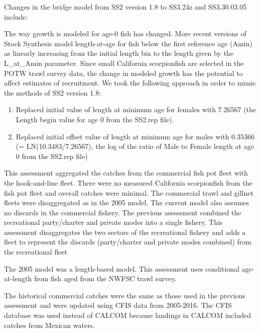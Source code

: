 \documentclass[12pt,]{article}
\begin{document}
Changes in the bridge model from SS2 version 1.8 to SS3.24z and
SS3.30.03.05 include:

The way growth is modeled for age-0 fish has changed. More recent
versions of Stock Synthesis model length-at-age for fish below the first
reference age (Amin) as linearly increasing from the initial length bin
to the length given by the L\_at\_Amin parameter. Since small California
scorpionfish are selected in the POTW trawl survey data, the change in
modeled growth has the potential to affect estimates of recruitment. We
took the following approach in order to mimic the methods of SS2 version
1.8:

\begin{enumerate}
 
 \item Replaced initial value of length at minimum age for females with 7.26567 (the Length begin value for age 
 0 from the SS2.rep file).
 
  \item Replaced initial offset value of length at minimum age for males with 0.35366 (= LN(10.3483/7.26567), the 
  log of the ratio of Male to Female length at age 0 from the SS2.rep file)

\end{enumerate}

This assessment aggregated the catches from the commercial fish pot
fleet with the hook-and-line fleet. There were no measured California
scorpionfish from the fish pot fleet and overall catches were minimal.
The commercial trawl and gillnet fleets were disaggregated as in the
2005 model. The current model also assumes no discards in the commercial
fishery. The previous assessment combined the recreational party/charter
and private modes into a single fishery. This assessment disaggregates
the two sectors of the recreational fishery and adds a fleet to
represent the discards (party/charter and private modes combined) from
the recreational fleet

The 2005 model was a length-based model. This assessment uses
conditional age-at-length from fish aged from the NWFSC trawl survey.

The historical commercial catches were the same as those used in the
previous assessment and were updated using CFIS data from 2005-2016. The
CFIS database was used instead of CALCOM because landings in CALCOM
included catches from Mexican waters.
\end{document}
